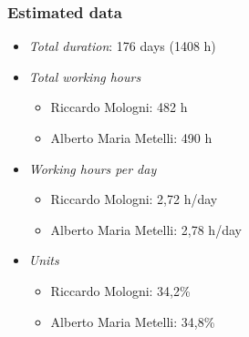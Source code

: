 \subsubsection{Estimated data}
\begin{itemize}
\item \emph{Total duration}: 176 days (1408 h)
\item \emph{Total working hours}

\begin{itemize}
\item Riccardo Mologni: 482 h
\item Alberto Maria Metelli: 490 h
\end{itemize}
\item \emph{Working hours per day}

\begin{itemize}
\item Riccardo Mologni: 2,72 h/day
\item Alberto Maria Metelli: 2,78 h/day
\end{itemize}
\item \emph{Units}

\begin{itemize}
\item Riccardo Mologni: 34,2\%
\item Alberto Maria Metelli: 34,8\%
\end{itemize}
\end{itemize}

